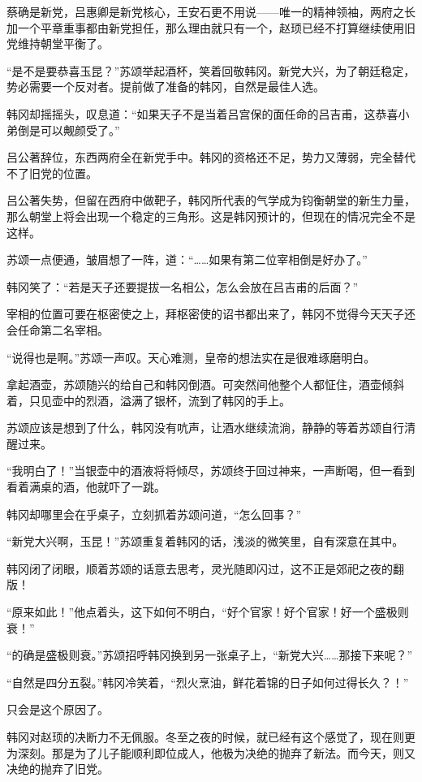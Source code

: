 蔡确是新党，吕惠卿是新党核心，王安石更不用说——唯一的精神领袖，两府之长加一个平章重事都由新党担任，那么理由就只有一个，赵顼已经不打算继续使用旧党维持朝堂平衡了。

“是不是要恭喜玉昆？”苏颂举起酒杯，笑着回敬韩冈。新党大兴，为了朝廷稳定，势必需要一个反对者。提前做了准备的韩冈，自然是最佳人选。

韩冈却摇摇头，叹息道：“如果天子不是当着吕宫保的面任命的吕吉甫，这恭喜小弟倒是可以觍颜受了。”

吕公著辞位，东西两府全在新党手中。韩冈的资格还不足，势力又薄弱，完全替代不了旧党的位置。

吕公著失势，但留在西府中做靶子，韩冈所代表的气学成为钧衡朝堂的新生力量，那么朝堂上将会出现一个稳定的三角形。这是韩冈预计的，但现在的情况完全不是这样。

苏颂一点便通，皱眉想了一阵，道：“……如果有第二位宰相倒是好办了。”

韩冈笑了：“若是天子还要提拔一名相公，怎么会放在吕吉甫的后面？”

宰相的位置可要在枢密使之上，拜枢密使的诏书都出来了，韩冈不觉得今天天子还会任命第二名宰相。

“说得也是啊。”苏颂一声叹。天心难测，皇帝的想法实在是很难琢磨明白。

拿起酒壶，苏颂随兴的给自己和韩冈倒酒。可突然间他整个人都怔住，酒壶倾斜着，只见壶中的烈酒，溢满了银杯，流到了韩冈的手上。

苏颂应该是想到了什么，韩冈没有吭声，让酒水继续流淌，静静的等着苏颂自行清醒过来。

“我明白了！”当银壶中的酒液将将倾尽，苏颂终于回过神来，一声断喝，但一看到看着满桌的酒，他就吓了一跳。

韩冈却哪里会在乎桌子，立刻抓着苏颂问道，“怎么回事？”

“新党大兴啊，玉昆！”苏颂重复着韩冈的话，浅淡的微笑里，自有深意在其中。

韩冈闭了闭眼，顺着苏颂的话意去思考，灵光随即闪过，这不正是郊祀之夜的翻版！

“原来如此！”他点着头，这下如何不明白，“好个官家！好个官家！好一个盛极则衰！”

“的确是盛极则衰。”苏颂招呼韩冈换到另一张桌子上，“新党大兴……那接下来呢？”

“自然是四分五裂。”韩冈冷笑着，“烈火烹油，鲜花着锦的日子如何过得长久？！”

只会是这个原因了。

韩冈对赵顼的决断力不无佩服。冬至之夜的时候，就已经有这个感觉了，现在则更为深刻。那是为了儿子能顺利即位成人，他极为决绝的抛弃了新法。而今天，则又决绝的抛弃了旧党。

